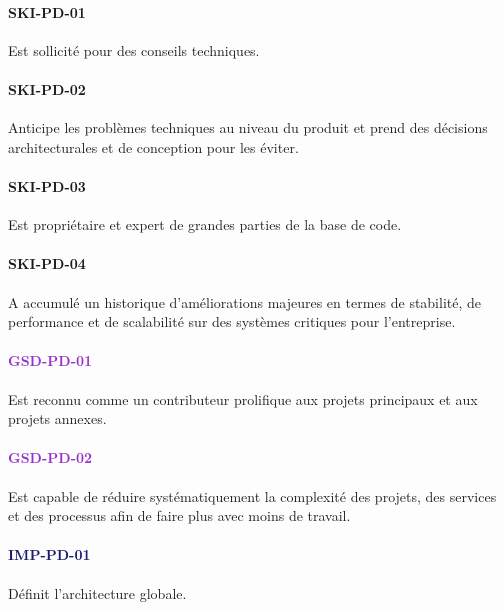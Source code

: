 \documentclass[a4paper, french, openany, 12pt]{book}
\newcommand\dex[1]{\textcolor{BrickRed}{\textbf{\uppercase{ski-{#1}}}}}
\newcommand\str[1]{\textcolor{DarkOrchid}{\textbf{\uppercase{gsd-{#1}}}}}
\newcommand\wis[1]{\textcolor{MidnightBlue}{\textbf{\uppercase{imp-{#1}}}}}
\begin{document}
\begin{multicols}{2}

  \paragraph*{\dex{pd-01}}

  Est sollicité pour des conseils techniques.
  
  \paragraph*{\dex{pd-02}}

  Anticipe les problèmes techniques au niveau du produit et prend des décisions architecturales et de conception pour les 
  éviter.

  \paragraph*{\dex{pd-03}}

  Est propriétaire et expert de grandes parties de la base de code.
  
  \paragraph*{\dex{pd-04}}

  A accumulé un historique d'améliorations majeures en termes de stabilité, de performance et de scalabilité sur des 
  systèmes critiques pour l'entreprise.

  \paragraph*{\str{pd-01}}

  Est reconnu comme un contributeur prolifique aux projets principaux et aux projets annexes.

  \paragraph*{\str{pd-02}}

  Est capable de réduire systématiquement la complexité des projets, des services et des processus afin de faire plus 
  avec moins de travail.

  \paragraph*{\wis{pd-01}}

  Définit l'architecture globale.


\end{multicols}
\end{document}
